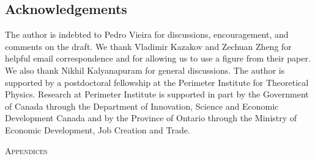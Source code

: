 \documentclass[letter,11pt]{article}
\begin{document}
\subsection*{Acknowledgements}
The author is indebted to Pedro Vieira
for discussions, encouragement, and comments on the draft.
We thank Vladimir Kazakov 
and Zechuan Zheng for helpful email correspondence and for 
allowing us to use a figure from their paper. 
We also thank Nikhil Kalyanapuram for general discussions. 
The author is supported by a 
postdoctoral fellowship at the Perimeter Institute for Theoretical Physics. 
Research at Perimeter Institute is supported in part by the Government of Canada 
through the Department of Innovation, Science and Economic Development Canada 
and by the Province of Ontario through the Ministry of Economic Development, Job Creation 
and Trade. 
\vspace{6mm}
\appendix
\begin{center} \large{\textsc{Appendices}}\end{center}
\end{document}
